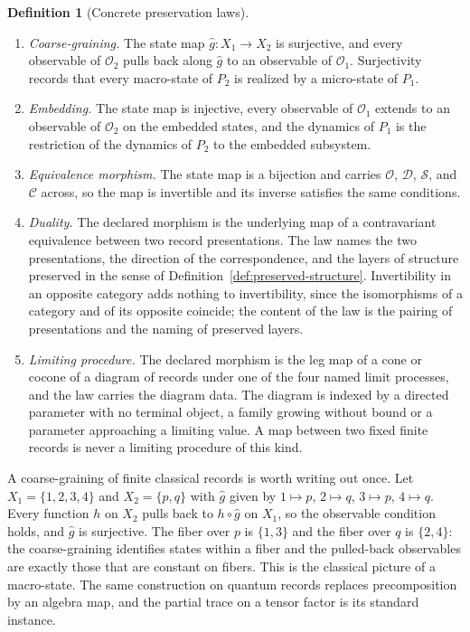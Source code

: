 \documentclass[11pt,letterpaper]{article}
\theoremstyle{definition}
\newtheorem{definition}[theorem]{Definition}
\theoremstyle{remark}
\begin{document}
\begin{definition}[Concrete preservation laws]
\label{def:concrete-laws}
\begin{enumerate}
\item \emph{Coarse-graining.} The state map $\hat g \colon X_1 \to X_2$ is surjective, and every observable of $\mathcal{O}_2$ pulls back along $\hat g$ to an observable of $\mathcal{O}_1$. Surjectivity records that every macro-state of $P_2$ is realized by a micro-state of $P_1$.
\item \emph{Embedding.} The state map is injective, every observable of $\mathcal{O}_1$ extends to an observable of $\mathcal{O}_2$ on the embedded states, and the dynamics of $P_1$ is the restriction of the dynamics of $P_2$ to the embedded subsystem.
\item \emph{Equivalence morphism.} The state map is a bijection and carries $\mathcal{O}$, $\mathcal{D}$, $\mathcal{S}$, and $\mathcal{C}$ across, so the map is invertible and its inverse satisfies the same conditions.
\item \emph{Duality.} The declared morphism is the underlying map of a contravariant equivalence between two record presentations. The law names the two presentations, the direction of the correspondence, and the layers of structure preserved in the sense of Definition~\ref{def:preserved-structure}. Invertibility in an opposite category adds nothing to invertibility, since the isomorphisms of a category and of its opposite coincide; the content of the law is the pairing of presentations and the naming of preserved layers.
\item \emph{Limiting procedure.} The declared morphism is the leg map of a cone or cocone of a diagram of records under one of the four named limit processes, and the law carries the diagram data. The diagram is indexed by a directed parameter with no terminal object, a family growing without bound or a parameter approaching a limiting value. A map between two fixed finite records is never a limiting procedure of this kind.
\end{enumerate}
\end{definition}

A coarse-graining of finite classical records is worth writing out once. Let $X_1 = \{1, 2, 3, 4\}$ and $X_2 = \{p, q\}$ with $\hat g$ given by $1 \mapsto p$, $2 \mapsto q$, $3 \mapsto p$, $4 \mapsto q$. Every function $h$ on $X_2$ pulls back to $h \circ \hat g$ on $X_1$, so the observable condition holds, and $\hat g$ is surjective. The fiber over $p$ is $\{1, 3\}$ and the fiber over $q$ is $\{2, 4\}$: the coarse-graining identifies states within a fiber and the pulled-back observables are exactly those that are constant on fibers. This is the classical picture of a macro-state. The same construction on quantum records replaces precomposition by an algebra map, and the partial trace on a tensor factor is its standard instance.
\end{document}
